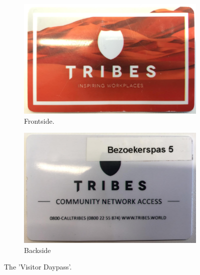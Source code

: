 \documentclass[11pt,a4paper,sans]{report} %
\begin{document}
\begin{figure}[htp]
\begin{subfigure}{.49\textwidth}
  \centering
  \includegraphics[width=1.0\linewidth]{images/amsovaltower/pasvoorkant}
  \caption{Frontside.}
  \label{fig.passfront}
\end{subfigure}%
\begin{subfigure}{.49\textwidth}
  \centering
  \includegraphics[width=1.0\linewidth]{images/amsovaltower/pasachterkant}
  \caption{Backside}
  \label{fig.passback}
\end{subfigure}
\caption{The 'Visitor Daypass'.}
\label{fig.daypass}
\end{figure}
\end{document}
